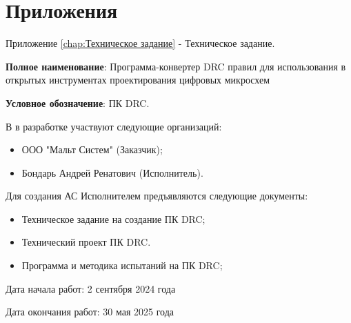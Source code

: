 \chapter*{Приложения}

Приложение \ref{chap:Техническое задание} - Техническое задание.







\textbf{Полное наименование}:
Программа-конвертер DRC правил для использования
в открытых инструментах проектирования цифровых микросхем

\textbf{Условное обозначение}: ПК DRC.


В в разработке участвуют следующие организаций:

\begin{itemize}
	\item ООО "Мальт Систем" (Заказчик);
	\item Бондарь Андрей Ренатович (Исполнитель).
\end{itemize}


Для создания АС Исполнителем предъявляются следующие документы:

\begin{itemize}
	\item Техническое задание на создание ПК DRC;
	\item Технический проект ПК DRC.
	\item Программа и методика испытаний на ПК DRC;
\end{itemize}


Дата начала работ: 2 сентября 2024 года

Дата окончания работ: 30 мая 2025 года


